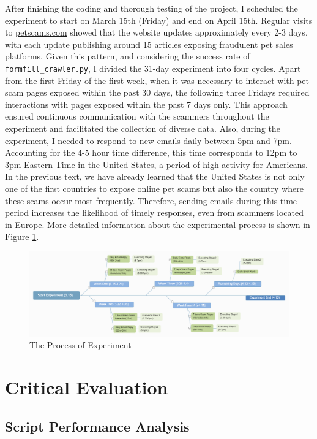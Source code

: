 \documentclass[ oneside,%
                    author={Cassie Qing Tang},
                    degree={BSc},
                     title={An Automated Response System for Disrupting Online Pet Scamming \\ },
                    subtitle={ }]{dissertation}
\begin{document}
After finishing the coding and thorough testing of the project, I scheduled the experiment to start on March 15th (Friday) and end on April 15th. Regular visits to \href{www.petscams.com}{petscams.com} showed that the website updates approximately every 2-3 days, with each update publishing around 15 articles exposing fraudulent pet sales platforms. Given this pattern, and considering the success rate of \texttt{formfill\_crawler.py}, I divided the 31-day experiment into four cycles. Apart from the first Friday of the first week, when it was necessary to interact with pet scam pages exposed within the past 30 days, the following three Fridays required interactions with pages exposed within the past 7 days only. This approach ensured continuous communication with the scammers throughout the experiment and facilitated the collection of diverse data. Also, during the experiment, I needed to respond to new emails daily between 5pm and 7pm. Accounting for the 4-5 hour time difference, this time corresponds to 12pm to 3pm Eastern Time in the United States, a period of high activity for Americans. In the previous text, we have already learned that the United States is not only one of the first countries to expose online pet scams but also the country where these scams occur most frequently. Therefore, sending emails during this time period increases the likelihood of timely responses, even from scammers located in Europe. More detailed information about the experimental process is shown in Figure \ref{fig:pic9}.
\begin{figure}[H]
\centering
\includegraphics[width=\linewidth]{pic/figure9.png}
\caption{The Process of Experiment}
\label{fig:pic9}
\end{figure}


\chapter{Critical Evaluation}
\label{sec:4}
\section{Script Performance Analysis}
\end{document}
